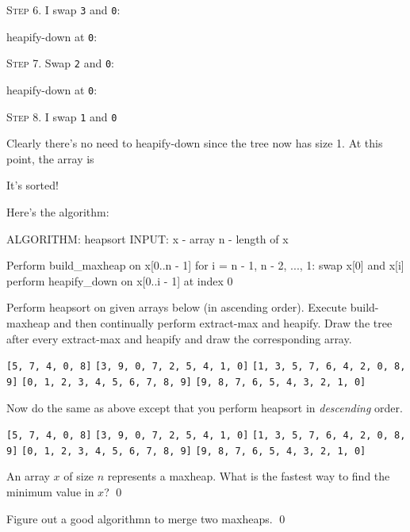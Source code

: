 



\textsc{Step 6}.
I swap \texttt{3} and \texttt{0}:



heapify-down at \texttt{0}:





\textsc{Step 7}.
Swap \texttt{2} and \texttt{0}:



heapify-down at \texttt{0}:





\textsc{Step 8}.
I swap \texttt{1} and \texttt{0}



Clearly there's no need to heapify-down since the tree now has size 1.
At this point, the array is

It's sorted!

Here's the algorithm:
\begin{console}
ALGORITHM: heapsort
INPUT:     x - array
           n - length of x

Perform build_maxheap on x[0..n - 1]
for i = n - 1, n - 2, ..., 1: 
    swap x[0] and x[i]
    perform heapify_down on x[0..i - 1] at index 0
\end{console}

\newpage
\begin{ex}
Perform heapsort on given arrays below (in ascending order).
Execute build-maxheap and then continually perform
extract-max and heapify.
Draw the tree after every extract-max and heapify and draw the
corresponding array.
\begin{tightlist}
  \li \verb![5, 7, 4, 0, 8]!
  \li \verb![3, 9, 0, 7, 2, 5, 4, 1, 0]!
  \li \verb![1, 3, 5, 7, 6, 4, 2, 0, 8, 9]!
  \li \verb![0, 1, 2, 3, 4, 5, 6, 7, 8, 9]!
  \li \verb![9, 8, 7, 6, 5, 4, 3, 2, 1, 0]!
\end{tightlist}
\end{ex}

\newpage
\begin{ex}
  Now do the same as above
  except that you perform heapsort in \textit{descending} order.
\begin{tightlist}
  \li \verb![5, 7, 4, 0, 8]!
  \li \verb![3, 9, 0, 7, 2, 5, 4, 1, 0]!
  \li \verb![1, 3, 5, 7, 6, 4, 2, 0, 8, 9]!
  \li \verb![0, 1, 2, 3, 4, 5, 6, 7, 8, 9]!
  \li \verb![9, 8, 7, 6, 5, 4, 3, 2, 1, 0]!
\end{tightlist}
\end{ex}


\newpage
\begin{ex}
An array $x$ of size $n$ represents a maxheap.
What is the fastest way to find the minimum value in $x$?
\qed
\end{ex}


\newpage
\begin{ex}
Figure out a good algorithmn to merge two maxheaps.
\qed
\end{ex}


